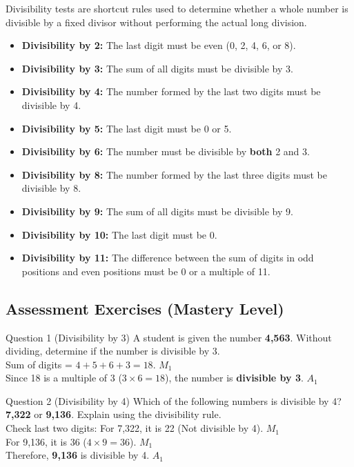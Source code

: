 \documentclass[12pt, a4paper, oneside]{article}
\begin{document}
\begin{tcolorbox}[colback=lightgrey, colframe=primaryblue, title=\textbf{Concept Summary}, arc=5pt]
    Divisibility tests are shortcut rules used to determine whether a whole number is divisible by a fixed divisor without performing the actual long division.
    
    \begin{itemize}
        \item \textbf{Divisibility by 2:} The last digit must be even (0, 2, 4, 6, or 8).
        \item \textbf{Divisibility by 3:} The sum of all digits must be divisible by 3.
        \item \textbf{Divisibility by 4:} The number formed by the last two digits must be divisible by 4.
        \item \textbf{Divisibility by 5:} The last digit must be 0 or 5.
        \item \textbf{Divisibility by 6:} The number must be divisible by \textbf{both} 2 and 3.
        \item \textbf{Divisibility by 8:} The number formed by the last three digits must be divisible by 8.
        \item \textbf{Divisibility by 9:} The sum of all digits must be divisible by 9.
        \item \textbf{Divisibility by 10:} The last digit must be 0.
        \item \textbf{Divisibility by 11:} The difference between the sum of digits in odd positions and even positions must be 0 or a multiple of 11.
    \end{itemize}
\end{tcolorbox}

\subsection*{Assessment Exercises (Mastery Level)}

\begin{solvingbox}{Question 1 (Divisibility by 3)}
A student is given the number \textbf{4,563}. Without dividing, determine if the number is divisible by 3. \\
Sum of digits = $4 + 5 + 6 + 3 = 18$. \hfill $M_1$ \\
Since 18 is a multiple of 3 ($3 \times 6 = 18$), the number is \textbf{divisible by 3}. \hfill $A_1$
\end{solvingbox}

\begin{solvingbox}{Question 2 (Divisibility by 4)}
Which of the following numbers is divisible by 4? \textbf{7,322} or \textbf{9,136}. Explain using the divisibility rule. \\
Check last two digits: For 7,322, it is 22 (Not divisible by 4). \hfill $M_1$ \\
For 9,136, it is 36 ($4 \times 9 = 36$). \hfill $M_1$ \\
Therefore, \textbf{9,136} is divisible by 4. \hfill $A_1$
\end{solvingbox}
\end{document}
